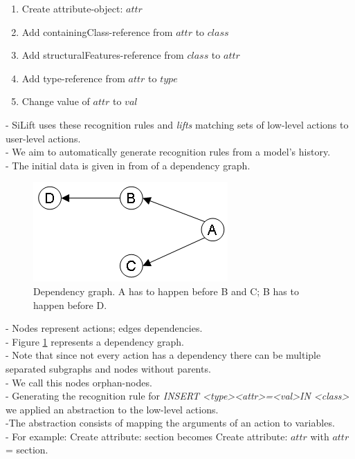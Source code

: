 \documentclass[10pt,a4paper,oneside]{scrartcl}
\begin{document}
	\begin{enumerate}
		\item Create attribute-object: $ attr$
		\item Add containingClass-reference from $ attr$  to $ class$
		\item Add structuralFeatures-reference from $ class$  to $ attr$
		\item Add type-reference from $ attr$  to $ type$
		\item Change value of $ attr$  to $ val$
	\end{enumerate}
	- SiLift uses these recognition rules and \textit{lifts} matching sets of low-level actions to user-level actions.
	\\
	
	- We aim to automatically generate recognition rules from a model's history.
	\\
	- The initial data is given in from of a dependency graph.
	\\
	\begin{figure}
		\centering
		\includegraphics{./res/Dependencygraph.png}
		\caption{Dependency graph. A has to happen before B and C; B has to happen before D.}
		\label{fig:depgraph}
	\end{figure}
	- Nodes represent actions; edges dependencies.
	\\
	- Figure \ref{fig:depgraph} represents a dependency graph.
	\\
	- Note that since not every action has a dependency there can be multiple separated subgraphs and nodes without parents. 
	\\
	- We call this nodes orphan-nodes.
	\\
	- Generating the recognition rule for \textit{INSERT \textless type\textgreater \textless attr\textgreater=\textless val\textgreater IN \textless class\textgreater} we applied an abstraction to the low-level actions.
	\\
	-The abstraction consists of mapping the arguments of an action to variables.
	\\
	- For example: Create attribute: section becomes Create attribute: $attr$ with $attr$ = section.
\end{document}
